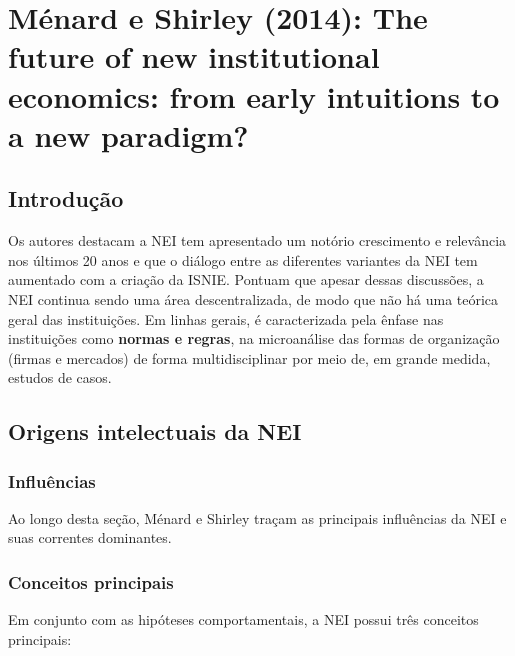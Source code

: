 \section*{Ménard e Shirley (2014): The future of new institutional economics: from early intuitions to a new paradigm?}

\subsection*{Introdução}


Os autores destacam a NEI tem apresentado um notório crescimento e relevância nos últimos 20 anos e que o diálogo entre as diferentes variantes da NEI tem aumentado com a criação da ISNIE. Pontuam que apesar dessas discussões, a NEI continua sendo  uma área descentralizada, de modo que não há uma teórica geral das instituições. Em linhas gerais, é caracterizada pela ênfase nas instituições como \textbf{normas e regras}, na microanálise das formas de organização (firmas e mercados) de forma multidisciplinar por meio de, em grande medida, estudos de casos.

\subsection*{Origens intelectuais da NEI}

\subsubsection*{Influências}

Ao longo desta seção, Ménard e Shirley traçam as principais influências da NEI e suas correntes dominantes.

\subsubsection*{Conceitos principais}

Em conjunto com as hipóteses comportamentais, a NEI possui três conceitos principais:

